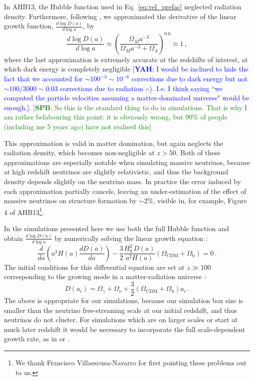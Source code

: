 \documentclass[useAMS, usenatbib]{mnras}
\newcommand{\spb}[1]{{\textcolor{green}{[{\bf SPB}: #1]}}}
\newcommand{\yah}[1]{{\textcolor{blue}{[{\bf YAH}: #1]}}}
\begin{document}
In AHB13, the Hubble function used in Eq.~\eqref{eq:vel_prefac}
neglected radiation density. Furthermore, following \cite{Bouchet:1995}, we
approximated the derivative of the linear growth function, $\frac{d \log D(a)}{d \log a}$, by
\begin{equation}
\frac{d \log D(a)}{d \log a} \approx \left(\frac{\Omega_M a^{-3}}{\Omega_M  a^{-3} + \Omega_\Lambda}\right)^{0.6} \approx 1\,,
\end{equation}
where the last approximation is extremely accurate at the redshifts of interest, at which dark energy is completely negligible \yah{I would be inclined to hide the fact that we accounted for $\sim 100^{-3} \sim 10^{-6}$ corrections due to dark energy but not $\sim 100/3000 \sim 0.03$ corrections due to radiation :-). I.e. I think saying ``we computed the particle velocities assuming a matter-dominated universe" would be enough.}. \spb{So this is the standard thing to do in simulations. That is why I am rather belabouring this point: it is obviously wrong, but 90\% of people (including me 5 years ago) have not realised this}

This approximation is valid in matter domination, but again neglects the radiation density,
which becomes non-negligible at $z > 50$. Both of these approximations are especially notable
when simulating massive neutrinos, because at high redshift neutrinos are slightly relativistic,
and thus the background density depends slightly on the neutrino mass. In practice the error
induced by each approximation partially cancels, leaving an under-estimation of the effect of
massive neutrinos on structure formation by $\sim 2 \%$, visible in, for example,
Figure 4 of AHB13\footnote{We thank Francisco Villaescusa-Navarro for first pointing these problems out to us.}.

In the simulations presented here we use both the full Hubble function
and obtain $\frac{d \log D(a)}{d \log a}$ by numerically solving
the linear growth equation \citep{Peebles:1993}:
\begin{equation}
\frac{d}{da}\left(a^3 H(a) \frac{d D(a)}{da}\right) - \frac{3}{2} \frac{H_0^2\,D(a)}{a^2 H(a)} \left(\Omega_\mathrm{CDM} + \Omega_\mathrm{b}\right)= 0\,.
\end{equation}
The initial conditions for this differential equation are set at $z \gg 100$ corresponding
to the growing mode in a matter-radiation universe \citep{Groth:1975}:
\begin{equation}
  D(a_i) = \Omega_\gamma + \Omega_\nu + \frac{3}{2} \left(\Omega_\mathrm{CDM} + \Omega_\mathrm{b}\right) a_i\,.
\end{equation}
The above is appropriate for our simulations, because our simulation box size is smaller than the neutrino free-streaming scale at our initial redshift, and thus neutrinos do not cluster. For simulations which are on larger scales or start at much later redshift it would be necessary to incorporate the full scale-dependent growth rate, as in \cite{Zennaro_2017} or \cite{OLeary_2012}.
\end{document}
